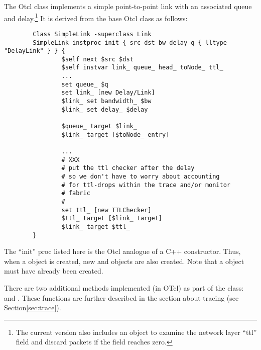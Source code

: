 The Otcl class  implements a simple point-to-point
link with an associated queue and
delay.\footnote{The current
version also includes an object to examine the
network layer ``ttl'' field and discard packets if the
field reaches zero.}
It is derived from the base Otcl class  as follows:
\begin{small}
\begin{verbatim}
        Class SimpleLink -superclass Link
        SimpleLink instproc init { src dst bw delay q { lltype "DelayLink" } } {
                $self next $src $dst
                $self instvar link_ queue_ head_ toNode_ ttl_
                ...
                set queue_ $q
                set link_ [new Delay/Link]
                $link_ set bandwidth_ $bw
                $link_ set delay_ $delay

                $queue_ target $link_
                $link_ target [$toNode_ entry]

                ...
                # XXX
                # put the ttl checker after the delay
                # so we don't have to worry about accounting
                # for ttl-drops within the trace and/or monitor
                # fabric
                #
                set ttl_ [new TTLChecker]
                $ttl_ target [$link_ target]
                $link_ target $ttl_
        }
\end{verbatim}
\end{small}
The ``init'' proc listed here is the Otcl analogue of a C++
constructor.
Thus, when a  object is created,
new  and  objects are
also created.
Note that a  object must have already been created.

There are two additional methods implemented (in OTcl) as part
of the  class:  and .
These functions are further described in the section about tracing
(see Section\ref{sec:trace}).
